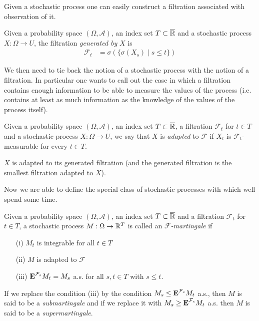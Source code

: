 Given a stochastic process one can easily construct a filtration
associated with observation of it.
\begin{defn}Given a probability space $(\Omega,  \mathcal{A})$, an
  index set $T \subset \overline{\mathbb{R}}$ and a stochastic process $X
  : \Omega \to U$, the filtration \emph{generated by} $X$ is 
\begin{align*}
\mathcal{F}_t &= \sigma(\lbrace \sigma(X_s) \mid s \leq t \rbrace)
\end{align*}
\end{defn}

We then need to tie back the notion of a stochastic process with the
notion of a filtration.  In particular one wants to call out the case
in which a filtration contains enough information to be able to
measure the values of the process (i.e. contains at least as much
information as the knowledge of the values of the process itself).
\begin{defn}Given a probability space $(\Omega,  \mathcal{A})$, an
  index set $T \subset \overline{\mathbb{R}}$, a
  filtration $\mathcal{F}_t$ for $t \in T$ and a stochastic process $X
  : \Omega \to U$, we say that $X$ is \emph{adapted} to $\mathcal{F}$
  if $X_t$ is $\mathcal{F}_t$-measurable for every $t \in T$.
\end{defn}

\begin{examp}$X$ is adapted to its generated filtration (and the
  generated filtration is the smallest filtration adapted to $X$).
\end{examp}

Now we are able to define the special class of stochastic processes
with which well spend some time.
\begin{defn}Given a probability space $(\Omega,  \mathcal{A})$, an
  index set $T \subset \overline{\mathbb{R}}$ and a
  filtration $\mathcal{F}_t$ for $t \in T$, a stochastic process $M :
  \Omega \to \mathbb{R}^T$ is called an \emph{$\mathcal{F}$-martingale} if 
\begin{itemize}
\item[(i)]$M_t$ is integrable for all $t \in T$
\item[(ii)]$M$ is adapted to $\mathcal{F}$
\item[(iii)]$\textbf{E}^{\mathcal{F}_s} M_t = M_s$ a.s. for all
  $s,t \in T$ with $s \leq t$.
\end{itemize}
If we replace the condition (iii) by the condition
$M_s \leq \textbf{E}^{\mathcal{F}_s} M_t$ a.s., then $M$ is said to
be a \emph{submartingale} and if we replace it with
$M_s \geq \textbf{E}^{\mathcal{F}_s} M_t $ a.s. then $M$ is said to be a
\emph{supermartingale}.
\end{defn}

